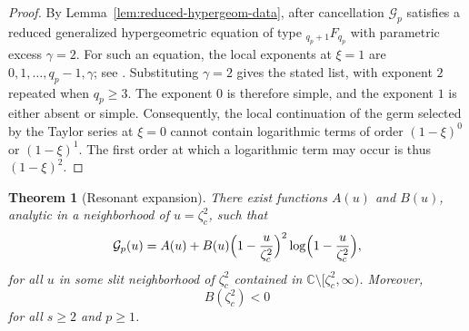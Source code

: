 \documentclass[11pt]{amsart}
\numberwithin{equation}{section}
\theoremstyle{plain}
\newtheorem{theorem}{Theorem}[section]
\theoremstyle{definition}
\theoremstyle{remark}
\newcommand{\CC}{\mathbb{C}}
\begin{document}
\begin{proof}
	By Lemma~\ref{lem:reduced-hypergeom-data}, after cancellation
	\(\mathcal G_p\) satisfies a reduced generalized hypergeometric equation of
	type \({}_{q_p+1}F_{q_p}\) with parametric excess \(\gamma=2\). For such an
	equation, the local exponents at \(\xi=1\) are
	\(0,1,\dots,q_p-1,\gamma\); see \cite[\S16.8]{NIST:DLMF}. Substituting
	\(\gamma=2\) gives the stated list, with exponent \(2\) repeated when
	\(q_p\ge3\). The exponent \(0\) is therefore simple, and the exponent
	\(1\) is either absent or simple. Consequently, the local continuation of
	the germ selected by the Taylor series at \(\xi=0\) cannot contain
	logarithmic terms of order \((1-\xi)^0\) or \((1-\xi)^1\). The first
	order at which a logarithmic term may occur is thus \((1-\xi)^2\).
\end{proof}

\begin{theorem}[Resonant expansion]
	\label{thm:resonant-expansion}
	There exist functions \(A(u)\) and \(B(u)\), analytic in a neighborhood of
	\(u=\zeta_c^2\), such that
	\begin{equation}\label{eq:resonant-expansion}
		\mathcal G_p(u)
		=
		A(u)+
		B(u)\Bigl(1-\frac{u}{\zeta_c^2}\Bigr)^2
		\log\Bigl(1-\frac{u}{\zeta_c^2}\Bigr),
	\end{equation}
	for all \(u\) in some slit neighborhood of \(\zeta_c^2\) contained in
	\(\CC\setminus[\zeta_c^2,\infty)\). Moreover,
	\[
		B(\zeta_c^2)<0
	\]
	for all \(s\ge2\) and \(p\ge1\).
\end{theorem}
\end{document}
